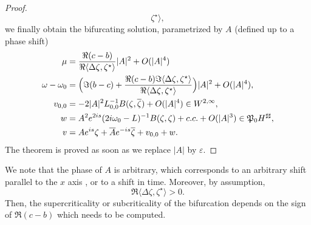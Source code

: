 \documentclass[11pt]{article}
\begin{document}
\begin{proof}
$$\zeta^\star \Big\rangle,
$$
we finally obtain the bifurcating solution, parametrized by $A$
(defined up to a phase shift)
\begin{align*}
\mu &= {\Re(c - b) \over \Re \langle \Delta \zeta, \zeta^\star \rangle}
|A|^2 + O(|A|^4)
\\ 
\omega - \omega_0 & = \Bigl( \Im (b-c) 
+ {\Re (c - b) \Im \langle \Delta \zeta, \zeta^\star \rangle \over
\Re \langle \Delta \zeta, \zeta^\star \rangle} \Bigr) |A|^2 + O(|A|^4),
\\
v_{0,0} &= - 2 |A|^2 L_{0,0}^{-1} B(\zeta,\overline{\zeta}) + O(|A|^4)
\in W^{2,\infty},
\\
w &= A^2 e^{2 i s} (2 i \omega_0 - L)^{-1} B(\zeta,\zeta)
+ c.c. + O(|A|^3) \in \frak{P}_0 H^{\sharp\sharp},
\\
v &= A e^{is} \zeta + \overline{A} e^{-i s} \overline{\zeta} + v_{0,0} + w.
\end{align*}
The theorem is proved as soon as we replace $|A|$ by $\varepsilon$.
\end{proof}

We note that the phase of $A$ is arbitrary, which corresponds to an arbitrary shift parallel to the $x$ axis , 
or to a shift in time. Moreover, by assumption,
$$
\Re \langle \Delta \zeta, \zeta^\star \rangle > 0.
$$
Then, the supercriticality or subcriticality of the bifurcation depends on
the sign of $\Re (c - b)$ which needs to be computed.







\end{document}
